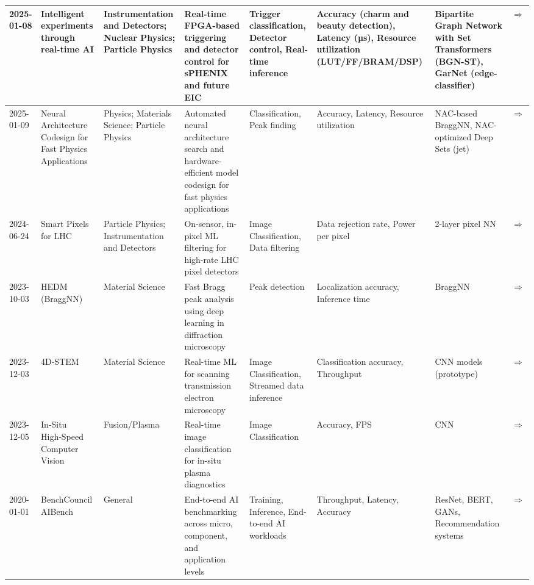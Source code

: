 \documentclass{article}
\begin{document}
\begin{landscape}
{\begin{longtable}{|p{1.5cm}|p{2.5cm}|p{2cm}|p{2cm}|p{3cm}|p{2cm}|p{2cm}|p{1cm}|}
2025-01-08 & Intelligent experiments through real-time AI & Instrumentation and Detectors; Nuclear Physics; Particle Physics & Real-time FPGA-based triggering and detector control for sPHENIX and future EIC & Trigger classification, Detector control, Real-time inference & Accuracy (charm and beauty detection), Latency (µs), Resource utilization (LUT/FF/BRAM/DSP) & Bipartite Graph Network with Set Transformers (BGN-ST), GarNet (edge-classifier) & \cite{kvapil2025intelligent} \href{https://arxiv.org/abs/2501.04845}{$\Rightarrow$ } \\ \hline
2025-01-09 & Neural Architecture Codesign for Fast Physics Applications & Physics; Materials Science; Particle Physics & Automated neural architecture search and hardware-efficient model codesign for fast physics applications & Classification, Peak finding & Accuracy, Latency, Resource utilization & NAC-based BraggNN, NAC-optimized Deep Sets (jet) & \cite{weitz2025nacph} \href{https://arxiv.org/abs/2501.05515}{$\Rightarrow$ } \\ \hline
2024-06-24 & Smart Pixels for LHC & Particle Physics; Instrumentation and Detectors & On-sensor, in-pixel ML filtering for high-rate LHC pixel detectors & Image Classification, Data filtering & Data rejection rate, Power per pixel & 2-layer pixel NN & \cite{parpillon2024smartpixels} \href{https://arxiv.org/abs/2406.14860}{$\Rightarrow$ } \\ \hline
2023-10-03 & HEDM (BraggNN) & Material Science & Fast Bragg peak analysis using deep learning in diffraction microscopy & Peak detection & Localization accuracy, Inference time & BraggNN & \cite{xiao2020braggnn} \href{https://arxiv.org/abs/2008.08198}{$\Rightarrow$ } \\ \hline
2023-12-03 & 4D‑STEM & Material Science & Real-time ML for scanning transmission electron microscopy & Image Classification, Streamed data inference & Classification accuracy, Throughput & CNN models (prototype) & \cite{anonymous2023_4dstem} \href{https://openreview.net/pdf?id=7yt3N0o0W9}{$\Rightarrow$ } \\ \hline
2023-12-05 & In‑Situ High‑Speed Computer Vision & Fusion/Plasma & Real-time image classification for in-situ plasma diagnostics & Image Classification & Accuracy, FPS & CNN & \cite{smith2023insitu} \href{https://arxiv.org/abs/2312.00128}{$\Rightarrow$ } \\ \hline
2020-01-01 & BenchCouncil AIBench & General & End-to-end AI benchmarking across micro, component, and application levels & Training, Inference, End-to-end AI workloads & Throughput, Latency, Accuracy & ResNet, BERT, GANs, Recommendation systems & \cite{gao2020aibench} \href{https://arxiv.org/abs/1908.08998}{$\Rightarrow$ } \\ \hline

\end{longtable}}
\end{landscape}
\end{document}
